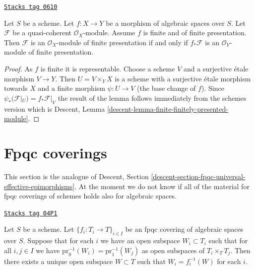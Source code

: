 \begin{lemma}
\label{spaces-descent-lemma-finite-finitely-presented-module}
\href{https://stacks.math.columbia.edu/tag/0610}{\texttt{Stacks tag 0610}}

Let $S$ be a scheme.
Let $f : X \to Y$ be a morphism of algebraic spaces over $S$.
Let $\mathcal{F}$ be a quasi-coherent $\mathcal{O}_X$-module.
Assume $f$ is finite and of finite presentation.
Then $\mathcal{F}$ is an $\mathcal{O}_X$-module of finite presentation
if and only if $f_*\mathcal{F}$ is an $\mathcal{O}_Y$-module of finite
presentation.
\end{lemma}

\begin{proof}
As $f$ is finite it is representable. Choose a scheme $V$ and a surjective
\'etale morphism $V \to Y$. Then $U = V \times_Y X$ is a scheme with
a surjective \'etale morphism towards $X$ and a finite morphism
$\psi : U \to V$ (the base change of $f$). Since
$\psi_*(\mathcal{F}|_U) = f_*\mathcal{F}|_V$
the result of the lemma follows immediately from the schemes version which
is
Descent, Lemma \ref{descent-lemma-finite-finitely-presented-module}.
\end{proof}

\section{Fpqc coverings}
\label{spaces-descent-section-fpqc}
This section is the analogue of
Descent, Section \ref{descent-section-fpqc-universal-effective-epimorphisms}.
At the moment we do not know if all of the material for
fpqc coverings of schemes holds also for algebraic spaces.

\begin{lemma}
\label{spaces-descent-lemma-open-fpqc-covering}
\href{https://stacks.math.columbia.edu/tag/04P1}{\texttt{Stacks tag 04P1}}

Let $S$ be a scheme.
Let $\{f_i : T_i \to T\}_{i \in I}$ be an fpqc covering
of algebraic spaces over $S$.
Suppose that for each $i$ we have an open subspace $W_i \subset T_i$
such that for all $i, j \in I$ we have
$\text{pr}_0^{-1}(W_i) = \text{pr}_1^{-1}(W_j)$ as open
subspaces of $T_i \times_T T_j$. Then there exists a unique open subspace
$W \subset T$ such that $W_i = f_i^{-1}(W)$ for each $i$.
\end{lemma}

